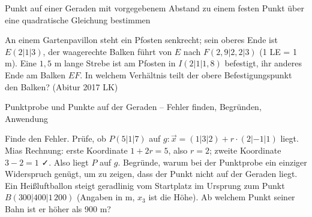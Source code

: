 \begin{aufgabe}{Punkt auf einer Geraden mit vorgegebenem Abstand zu einem festen Punkt über eine quadratische Gleichung bestimmen}
\begin{teile}
\teil An einem Gartenpavillon steht ein Pfosten senkrecht; sein oberes Ende ist $E(2 | 1 | 3)$, der waagerechte Balken führt von $E$ nach $F(2{,}9 | 2{,}2 | 3)$ (1 LE = 1 m). Eine $1{,}5$ m lange Strebe ist am Pfosten in $I(2 | 1 | 1{,}8)$ befestigt, ihr anderes Ende am Balken $EF$. In welchem Verhältnis teilt der obere Befestigungspunkt den Balken? \hfill (Abitur 2017 LK)
\end{teile}
\end{aufgabe}

\begin{aufgabe}{Punktprobe und Punkte auf der Geraden – Fehler finden, Begründen, Anwendung}
\begin{teile}
\teil Finde den Fehler. Prüfe, ob $P(5 | 1 | 7)$ auf $g\colon \vec x = (1 | 3 | 2) + r \cdot (2 | -1 | 1)$ liegt. Mias Rechnung: erste Koordinate $1 + 2r = 5$, also $r = 2$; zweite Koordinate $3 - 2 = 1$ ✓. Also liegt $P$ auf $g$.
\teil Begründe, warum bei der Punktprobe ein einziger Widerspruch genügt, um zu zeigen, dass der Punkt nicht auf der Geraden liegt.
\teil Ein Heißluftballon steigt geradlinig vom Startplatz im Ursprung zum Punkt $B(300 | 400 | 1\,200)$ (Angaben in m, $x_3$ ist die Höhe). Ab welchem Punkt seiner Bahn ist er höher als 900 m?
\end{teile}
\end{aufgabe}
